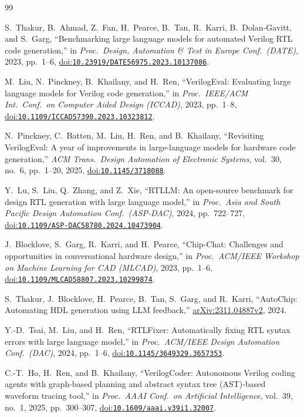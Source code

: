\documentclass[11pt,a4paper]{article}
\newcommand{\doi}[1]{\href{https://doi.org/#1}{doi:\nolinkurl{#1}}}
\begin{document}
\FloatBarrier
\begingroup\small
\begin{thebibliography}{99}

 S.~Thakur, B.~Ahmad, Z.~Fan, H.~Pearce, B.~Tan, R.~Karri, B.~Dolan-Gavitt, and S.~Garg,
``Benchmarking large language models for automated Verilog RTL code generation,'' in \emph{Proc.\ Design,
Automation \& Test in Europe Conf.\ (DATE)}, 2023, pp.~1--6, \doi{10.23919/DATE56975.2023.10137086}.

 M.~Liu, N.~Pinckney, B.~Khailany, and H.~Ren, ``VerilogEval: Evaluating large language models
for Verilog code generation,'' in \emph{Proc.\ IEEE/ACM Int.\ Conf.\ on Computer Aided Design (ICCAD)}, 2023,
pp.~1--8, \doi{10.1109/ICCAD57390.2023.10323812}.

 N.~Pinckney, C.~Batten, M.~Liu, H.~Ren, and B.~Khailany, ``Revisiting VerilogEval: A year of
improvements in large-language models for hardware code generation,'' \emph{ACM Trans.\ Design Automation of
Electronic Systems}, vol.~30, no.~6, pp.~1--20, 2025, \doi{10.1145/3718088}.

 Y.~Lu, S.~Liu, Q.~Zhang, and Z.~Xie, ``RTLLM: An open-source benchmark for design RTL generation
with large language model,'' in \emph{Proc.\ Asia and South Pacific Design Automation Conf.\ (ASP-DAC)}, 2024,
pp.~722--727, \doi{10.1109/ASP-DAC58780.2024.10473904}.

 J.~Blocklove, S.~Garg, R.~Karri, and H.~Pearce, ``Chip-Chat: Challenges and opportunities in
conversational hardware design,'' in \emph{Proc.\ ACM/IEEE Workshop on Machine Learning for CAD (MLCAD)}, 2023,
pp.~1--6, \doi{10.1109/MLCAD58807.2023.10299874}.

 S.~Thakur, J.~Blocklove, H.~Pearce, B.~Tan, S.~Garg, and R.~Karri, ``AutoChip: Automating HDL
generation using LLM feedback,'' \href{https://arxiv.org/abs/2311.04887v2}{arXiv:2311.04887v2}, 2024.

 Y.-D.~Tsai, M.~Liu, and H.~Ren, ``RTLFixer: Automatically fixing RTL syntax errors with large
language model,'' in \emph{Proc.\ ACM/IEEE Design Automation Conf.\ (DAC)}, 2024, pp.~1--6,
\doi{10.1145/3649329.3657353}.

 C.-T.~Ho, H.~Ren, and B.~Khailany, ``VerilogCoder: Autonomous Verilog coding agents with
graph-based planning and abstract syntax tree (AST)-based waveform tracing tool,'' in \emph{Proc.\ AAAI Conf.\ on
Artificial Intelligence}, vol.~39, no.~1, 2025, pp.~300--307, \doi{10.1609/aaai.v39i1.32007}.


\end{thebibliography}
\end{document}
